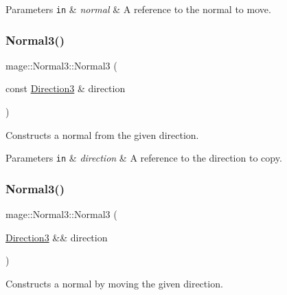 \begin{DoxyParams}[1]{Parameters}
\mbox{\tt in}  & {\em normal} & A reference to the normal to move. \\
\hline
\end{DoxyParams}
\hypertarget{structmage_1_1_normal3_a0942e7aace8354f0a414f77ccf90b69c}{}\label{structmage_1_1_normal3_a0942e7aace8354f0a414f77ccf90b69c} 
\subsubsection{\texorpdfstring{Normal3()}{Normal3()}\hspace{0.1cm}{\footnotesize\ttfamily [5/8]}}
{\footnotesize\ttfamily mage\+::\+Normal3\+::\+Normal3 (\begin{DoxyParamCaption}\item[{const \hyperlink{structmage_1_1_direction3}{Direction3} \&}]{direction }\end{DoxyParamCaption})\hspace{0.3cm}{\ttfamily [explicit]}}

Constructs a normal from the given direction.


\begin{DoxyParams}[1]{Parameters}
\mbox{\tt in}  & {\em direction} & A reference to the direction to copy. \\
\hline
\end{DoxyParams}
\hypertarget{structmage_1_1_normal3_a3799d741c08159f26f5ae13b2df98c56}{}\label{structmage_1_1_normal3_a3799d741c08159f26f5ae13b2df98c56} 
\subsubsection{\texorpdfstring{Normal3()}{Normal3()}\hspace{0.1cm}{\footnotesize\ttfamily [6/8]}}
{\footnotesize\ttfamily mage\+::\+Normal3\+::\+Normal3 (\begin{DoxyParamCaption}\item[{\hyperlink{structmage_1_1_direction3}{Direction3} \&\&}]{direction }\end{DoxyParamCaption})\hspace{0.3cm}{\ttfamily [explicit]}}

Constructs a normal by moving the given direction.


